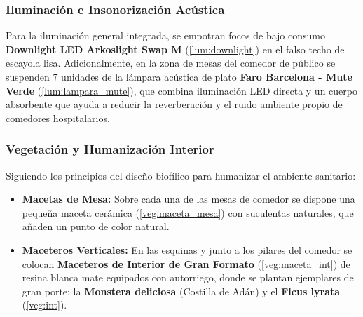\subsubsection{Iluminación e Insonorización Acústica}
Para la iluminación general integrada, se empotran focos de bajo consumo \textbf{Downlight LED Arkoslight Swap M} (\ref{lum:downlight}) en el falso techo de escayola lisa. Adicionalmente, en la zona de mesas del comedor de público se suspenden 7 unidades de la lámpara acústica de plato \textbf{Faro Barcelona - Mute Verde} (\ref{lum:lampara_mute}), que combina iluminación LED directa y un cuerpo absorbente que ayuda a reducir la reverberación y el ruido ambiente propio de comedores hospitalarios.

\subsubsection{Vegetación y Humanización Interior}
Siguiendo los principios del diseño biofílico para humanizar el ambiente sanitario:
\begin{itemize}
    \item \textbf{Macetas de Mesa:} Sobre cada una de las mesas de comedor se dispone una pequeña maceta cerámica (\ref{veg:maceta_mesa}) con suculentas naturales, que añaden un punto de color natural.
    \item \textbf{Maceteros Verticales:} En las esquinas y junto a los pilares del comedor se colocan \textbf{Maceteros de Interior de Gran Formato} (\ref{veg:maceta_int}) de resina blanca mate equipados con autorriego, donde se plantan ejemplares de gran porte: la \textbf{Monstera deliciosa} (Costilla de Adán) y el \textbf{Ficus lyrata} (\ref{veg:int}).
\end{itemize}
